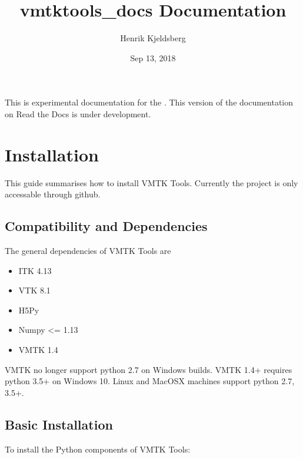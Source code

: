 \documentclass[letterpaper,10pt,english]{sphinxmanual}
\title{vmtktools\_docs Documentation}
\date{Sep 13, 2018}
\author{Henrik Kjeldsberg}
\begin{document}
\maketitle
\sphinxtableofcontents
{}\label{\detokenize{vmtktools_docs::doc}}


This is experimental documentation for the .  This version of the documentation on
Read the Docs is under development.


\chapter{Installation}
\label{\detokenize{installation:installation}}\label{\detokenize{installation:vmtk-tools}}\label{\detokenize{installation::doc}}
This guide summarises how to install VMTK Tools.
Currently the project is only accessable through github.


\section{Compatibility and Dependencies}
\label{\detokenize{installation:compatibility-and-dependencies}}
The general dependencies of VMTK Tools are
\begin{itemize}
\item {} 
ITK 4.13

\item {} 
VTK 8.1

\item {} 
H5Py

\item {} 
Numpy \textless{}= 1.13

\item {} 
VMTK 1.4

\end{itemize}

VMTK no longer support python 2.7 on Windows builds.
VMTK 1.4+ requires python 3.5+ on Windows 10.
Linux and MacOSX machines support python 2.7, 3.5+.


\section{Basic Installation}
\label{\detokenize{installation:basic-installation}}
To install the Python components of VMTK Tools:

%
\begin{sphinxVerbatim}[commandchars=\\\{\}]
  
  
\end{sphinxVerbatim}
\end{document}
